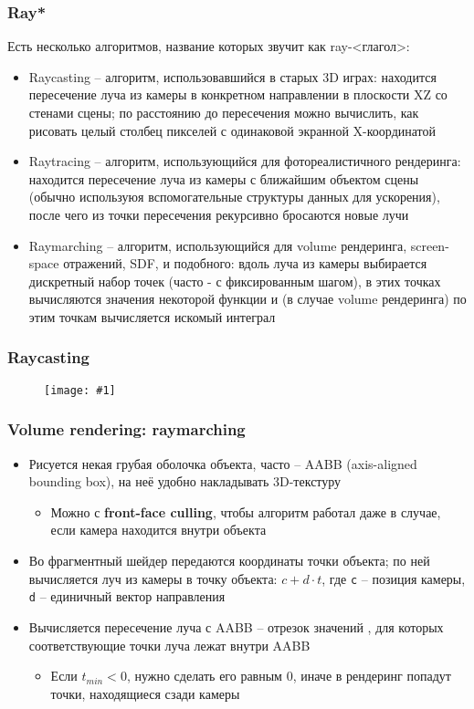 \documentclass{beamer}
\newcommand{\slideimage}[1]{
  \begin{figure}
    \begin{adjustbox}{width=\textwidth, totalheight=\textheight-2\baselineskip-2\baselineskip,keepaspectratio}
      \texttt{[image: \#1]}
    \end{adjustbox}
  \end{figure}
}
\begin{document}
\begin{frame}[fragile]
\fontsize{10pt}{10pt}
\frametitle{Ray*}
Есть несколько алгоритмов, название которых звучит как ray-<глагол>:
\pause
\begin{itemize}
\item Raycasting -- алгоритм, использовавшийся в старых 3D играх: находится пересечение луча из камеры в конкретном направлении в плоскости XZ со стенами сцены; по расстоянию до пересечения можно вычислить, как рисовать целый столбец пикселей с одинаковой экранной X-координатой
\pause
\item Raytracing -- алгоритм, использующийся для фотореалистичного рендеринга: находится пересечение луча из камеры с ближайшим объектом сцены (обычно используюя вспомогательные структуры данных для ускорения), после чего из точки пересечения рекурсивно бросаются новые лучи
\pause
\item Raymarching -- алгоритм, использующийся для volume рендеринга, screen-space отражений, SDF, и подобного: вдоль луча из камеры выбирается дискретный набор точек (часто - с фиксированным шагом), в этих точках вычисляются значения некоторой функции и (в случае volume рендеринга) по этим точкам вычисляется искомый интеграл
\end{itemize}
\end{frame}

\begin{frame}[fragile]
\frametitle{Raycasting}
\slideimage{raycasting.png}
\end{frame}

\begin{frame}[fragile]
\frametitle{Volume rendering: raymarching}
\begin{itemize}
\item Рисуется некая грубая оболочка объекта, часто -- AABB (axis-aligned bounding box), на неё удобно накладывать 3D-текстуру
\begin{itemize}
\item Можно с \textbf{front-face culling}, чтобы алгоритм работал даже в случае, если камера находится внутри объекта
\end{itemize}
\pause
\item Во фрагментный шейдер передаются координаты точки объекта; по ней вычисляется луч из камеры в точку объекта: \begin{math}c + d\cdot t\end{math}, где \verb|c| -- позиция камеры, \verb|d| -- единичный вектор направления
\pause
\item Вычисляется пересечение луча с AABB -- отрезок значений \begin{math}[t_{min}, t_{max}]\end{math}, для которых соответствующие точки луча лежат внутри AABB
\begin{itemize}
\item Если \begin{math}t_{min} < 0\end{math}, нужно сделать его равным 0, иначе в рендеринг попадут точки, находящиеся сзади камеры
\end{itemize}
\end{itemize}
\end{frame}
\end{document}
